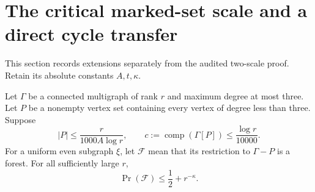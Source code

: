 \section{The critical marked-set scale and a direct cycle transfer}
\label{sec:two-scale-extensions}

This section records extensions separately from the audited two-scale proof.
Retain its absolute constants $A,t,\kappa$.

\begin{theorem}
\label{thm:two-scale-critical-marking}
Let $\Gamma$ be a connected multigraph of rank $r$ and maximum degree at most three.
Let $P$ be a nonempty vertex set containing every vertex of degree less than three.
Suppose
\[
 |P|\le\frac{r}{1000A\log r},\qquad
 c:=\operatorname{comp}(\Gamma[P])\le\frac{\log r}{10000}.
\]
For a uniform even subgraph $\xi$, let $\mathcal F$ mean that its restriction to $\Gamma-P$ is a forest.
For all sufficiently large $r$,
\[
 \Pr(\mathcal F)\le\frac12+r^{-\kappa}.
\]
\end{theorem}

